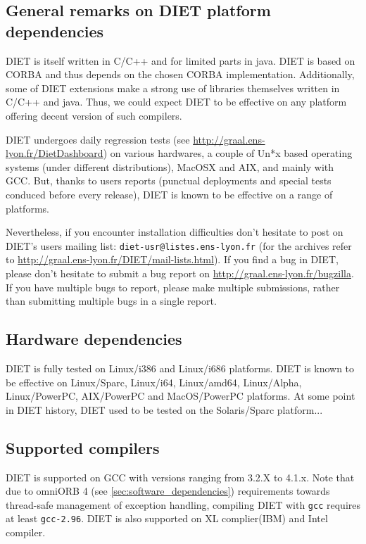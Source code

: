 \subsection{General remarks on DIET platform dependencies}

DIET is itself written in C/C++ and for limited parts in java. DIET is
based on CORBA and thus depends on the chosen CORBA implementation.
Additionally, some of DIET extensions make a strong use of libraries
themselves written in C/C++ and java.
Thus, we could expect DIET to be effective on any platform offering
decent version of such compilers.

DIET undergoes daily regression tests
(see \url{http://graal.ens-lyon.fr/DietDashboard})
on various hardwares, a couple of Un*x based operating systems (under
different distributions), MacOSX and AIX, and mainly with GCC.
But, thanks to users reports (punctual deployments and special tests
conduced before every release), DIET is known to be effective on a
range of platforms.

Nevertheless, if you encounter installation difficulties don't hesitate
to post on DIET's users mailing list: \verb+diet-usr@listes.ens-lyon.fr+
(for the archives refer to \url{http://graal.ens-lyon.fr/DIET/mail-lists.html}).
If you find a bug in DIET, please don't hesitate to submit a bug report on
\url{http://graal.ens-lyon.fr/bugzilla}. If you have multiple bugs
to report, please make multiple submissions, rather than submitting
multiple bugs in a single report.

\subsection{Hardware dependencies}
DIET is fully tested on Linux/i386 and Linux/i686 platforms.
DIET is known to be effective on Linux/Sparc, Linux/i64, Linux/amd64,
Linux/Alpha, Linux/PowerPC, AIX/PowerPC and MacOS/PowerPC platforms.
At some point in DIET history, DIET used to be tested on the Solaris/Sparc
platform...

\subsection{Supported compilers}
DIET is supported on GCC with versions ranging from 3.2.X to 4.1.x.
Note that due to omniORB 4 (see \ref{sec:software_dependencies}) requirements
towards thread-safe management of exception handling, compiling DIET with
\verb+gcc+ requires at least \verb+gcc-2.96+.
DIET is also supported on XL complier(IBM) and Intel compiler.


